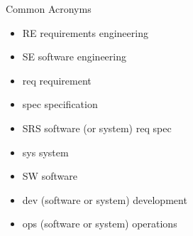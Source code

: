 
\begin{Slide}{Common Acronyms}

\begin{itemize}
\item RE   \hfill requirements engineering
\item SE   \hfill software engineering
\item req  \hfill requirement 
\item spec \hfill specification
\item SRS  \hfill software (or system) req spec
\item sys  \hfill system
\item SW   \hfill software
\item dev  \hfill (software or system) development
\item ops  \hfill (software or system) operations


\end{itemize}
\end{Slide}